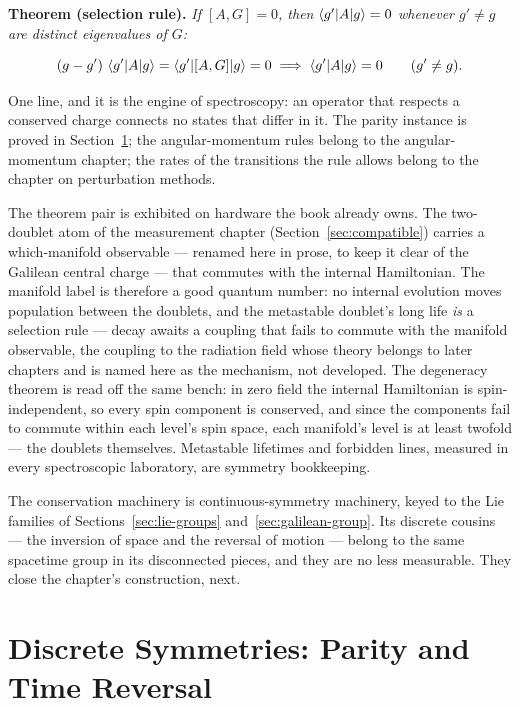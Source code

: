 \textbf{Theorem (selection rule).} \emph{If $[A,G] = 0$, then $\braket{g'|A|g} = 0$ whenever $g' \neq g$ are distinct eigenvalues of $G$:}
\begin{linenomath}
    \begin{equation}
        (g - g')\,\braket{g'|A|g} = \braket{g'|[A,G]|g} = 0
        \;\Longrightarrow\;
        \braket{g'|A|g} = 0 \qquad (g' \neq g) .
        \label{eq:selection-rule}
    \end{equation}
\end{linenomath}
One line, and it is the engine of spectroscopy: an operator that respects a conserved charge connects no states that differ in it. The parity instance is proved in Section~\ref{sec:discrete-symmetries}; the angular-momentum rules belong to the angular-momentum chapter; the rates of the transitions the rule allows belong to the chapter on perturbation methods.

The theorem pair is exhibited on hardware the book already owns. The two-doublet atom of the measurement chapter (Section~\ref{sec:compatible}) carries a which-manifold observable --- renamed here in prose, to keep it clear of the Galilean central charge --- that commutes with the internal Hamiltonian. The manifold label is therefore a good quantum number: no internal evolution moves population between the doublets, and the metastable doublet's long life \emph{is} a selection rule --- decay awaits a coupling that fails to commute with the manifold observable, the coupling to the radiation field whose theory belongs to later chapters and is named here as the mechanism, not developed. The degeneracy theorem is read off the same bench: in zero field the internal Hamiltonian is spin-independent, so every spin component is conserved, and since the components fail to commute within each level's spin space, each manifold's level is at least twofold --- the doublets themselves. Metastable lifetimes and forbidden lines, measured in every spectroscopic laboratory, are symmetry bookkeeping.

The conservation machinery is continuous-symmetry machinery, keyed to the Lie families of Sections~\ref{sec:lie-groups} and~\ref{sec:galilean-group}. Its discrete cousins --- the inversion of space and the reversal of motion --- belong to the same spacetime group in its disconnected pieces, and they are no less measurable. They close the chapter's construction, next.

\section{Discrete Symmetries: Parity and Time Reversal}
\label{sec:discrete-symmetries}

